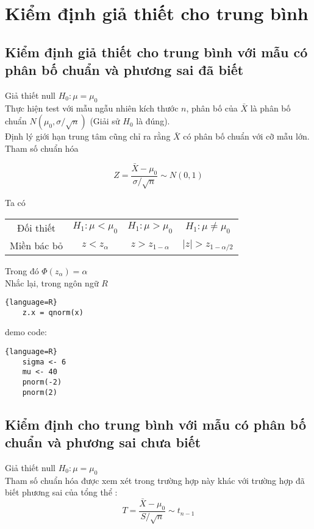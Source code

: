
\chapter{Kiểm định giả thiết cho trung bình}

\section{Kiểm định giả thiết cho trung bình với mẫu có phân bố chuẩn và phương sai đã biết}
Giả thiết null $H_0: \mu = \mu_0$ \\
Thực hiện test với mẫu ngẫu nhiên kích thước $n$, phân bố của $\bar{X}$ là phân bố chuẩn $N(\mu_0, \sigma / \sqrt{n})$
(Giải sử $H_0$ là đúng). \\
Định lý giới hạn trung tâm cũng chỉ ra rằng $\bar{X}$ có phân bố chuẩn với cỡ mẫu lớn. \\
Tham số chuẩn hóa 

$$Z = \frac{\bar{X} - \mu_0}{\sigma / \sqrt{n}} \sim N(0, 1)$$

Ta có

\begin{center}
    \begin{tabular}{| c | c | c | c |}
        \hline
        Đối thiết & $H_1: \mu < \mu_0$ & $H_1: \mu > \mu_0$ & $H_1: \mu \neq \mu_0$ \\
        Miền bác bỏ & $z < z_{\alpha}$ & $z > z_{1-\alpha}$ & $\lvert z \rvert > z_{1 - \alpha / 2}$ \\
        \hline
    \end{tabular}
\end{center}

Trong đó $\Phi(z_\alpha) = \alpha$ \\
Nhắc lại, trong ngôn ngữ $R$
\begin{lstlisting}{language=R}
    z.x = qnorm(x)
\end{lstlisting}

demo code: 
\begin{lstlisting}{language=R}
    sigma <- 6
    mu <- 40
    pnorm(-2)
    pnorm(2)
\end{lstlisting}


\section{Kiểm định cho trung bình với mẫu có phân bố chuẩn và phương sai chưa biết}

Giả thiết null $H_0: \mu = \mu_0$ \\
Tham số chuẩn hóa được xem xét trong trường hợp này khác với trường hợp đã biết phương sai của tổng thể
:
$$T = \frac{\bar{X} - \mu_0}{S/ \sqrt{n}} \sim t_{n - 1}$$

